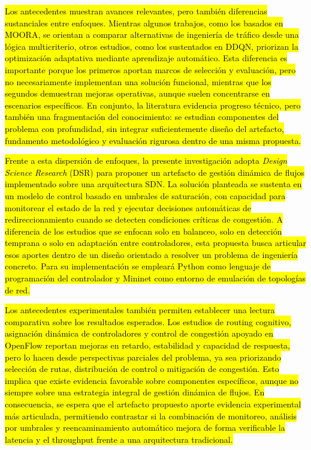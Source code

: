 \documentclass[12pt,a4paper]{article}
\newcommand{\introhl}[2]{%
    {\sethlcolor{#1}\hl{#2}}%
}
\begin{document}
\introhl{introproblem}{Los antecedentes muestran avances relevantes, pero también diferencias sustanciales entre enfoques. Mientras algunos trabajos, como los basados en MOORA, se orientan a comparar alternativas de ingeniería de tráfico desde una lógica multicriterio, otros estudios, como los sustentados en DDQN, priorizan la optimización adaptativa mediante aprendizaje automático. Esta diferencia es importante porque los primeros aportan marcos de selección y evaluación, pero no necesariamente implementan una solución funcional, mientras que los segundos demuestran mejoras operativas, aunque suelen concentrarse en escenarios específicos. En conjunto, la literatura evidencia progreso técnico, pero también una fragmentación del conocimiento: se estudian componentes del problema con profundidad, sin integrar suficientemente diseño del artefacto, fundamento metodológico y evaluación rigurosa dentro de una misma propuesta.} \parencite{moora_sdn, ddqn_sdn}

\introhl{introsolution}{Frente a esta dispersión de enfoques, la presente investigación adopta \textit{Design Science Research} (DSR) para proponer un artefacto de gestión dinámica de flujos implementado sobre una arquitectura SDN. La solución planteada se sustenta en un modelo de control basado en umbrales de saturación, con capacidad para monitorear el estado de la red y ejecutar decisiones automáticas de redireccionamiento cuando se detecten condiciones críticas de congestión. A diferencia de los estudios que se enfocan solo en balanceo, solo en detección temprana o solo en adaptación entre controladores, esta propuesta busca articular esos aportes dentro de un diseño orientado a resolver un problema de ingeniería concreto. Para su implementación se empleará Python como lenguaje de programación del controlador y Mininet como entorno de emulación de topologías de red.} \parencite{dynamic_lb_sdn, deep_learning_ryu, qos_lb_sdn, adaptive_lb_sdn}

\introhl{introresults}{Los antecedentes experimentales también permiten establecer una lectura comparativa sobre los resultados esperados. Los estudios de routing cognitivo, asignación dinámica de controladores y control de congestión apoyado en OpenFlow reportan mejoras en retardo, estabilidad y capacidad de respuesta, pero lo hacen desde perspectivas parciales del problema, ya sea priorizando selección de rutas, distribución de control o mitigación de congestión. Esto implica que existe evidencia favorable sobre componentes específicos, aunque no siempre sobre una estrategia integral de gestión dinámica de flujos. En consecuencia, se espera que el artefacto propuesto aporte evidencia experimental más articulada, permitiendo contrastar si la combinación de monitoreo, análisis por umbrales y reencaminamiento automático mejora de forma verificable la latencia y el throughput frente a una arquitectura tradicional.} \parencite{cognitive_routing_sdn, controller_assignment_sdn, red_openflow_sdn}
\end{document}
